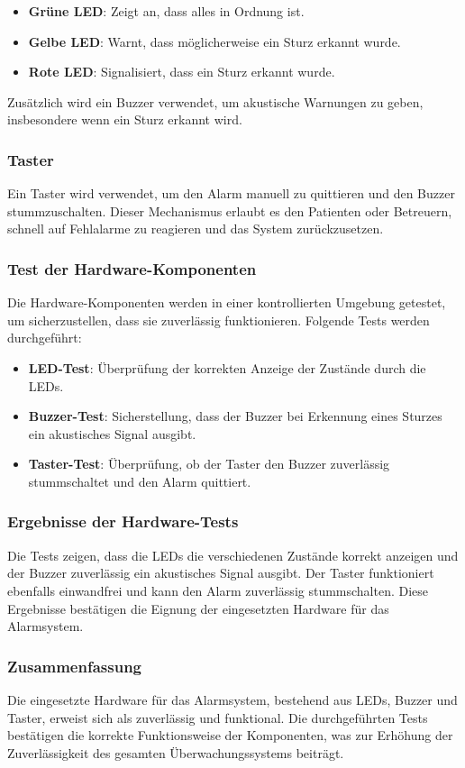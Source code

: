 \begin{itemize}
	\item \textbf{Grüne LED}: Zeigt an, dass alles in Ordnung ist.
	\item \textbf{Gelbe LED}: Warnt, dass möglicherweise ein Sturz erkannt wurde.
	\item \textbf{Rote LED}: Signalisiert, dass ein Sturz erkannt wurde.
\end{itemize}

Zusätzlich wird ein Buzzer verwendet, um akustische Warnungen zu geben, insbesondere wenn ein Sturz erkannt wird. 

\subsubsection{Taster}
Ein Taster wird verwendet, um den Alarm manuell zu quittieren und den Buzzer stummzuschalten. Dieser Mechanismus erlaubt es den Patienten oder Betreuern, schnell auf Fehlalarme zu reagieren und das System zurückzusetzen.

\subsubsection{Test der Hardware-Komponenten}
Die Hardware-Komponenten werden in einer kontrollierten Umgebung getestet, um sicherzustellen, dass sie zuverlässig funktionieren. Folgende Tests werden durchgeführt:

\begin{itemize}
	\item \textbf{LED-Test}: Überprüfung der korrekten Anzeige der Zustände durch die LEDs.
	\item \textbf{Buzzer-Test}: Sicherstellung, dass der Buzzer bei Erkennung eines Sturzes ein akustisches Signal ausgibt.
	\item \textbf{Taster-Test}: Überprüfung, ob der Taster den Buzzer zuverlässig stummschaltet und den Alarm quittiert.
\end{itemize}

\subsubsection{Ergebnisse der Hardware-Tests}
Die Tests zeigen, dass die LEDs die verschiedenen Zustände korrekt anzeigen und der Buzzer zuverlässig ein akustisches Signal ausgibt. Der Taster funktioniert ebenfalls einwandfrei und kann den Alarm zuverlässig stummschalten. Diese Ergebnisse bestätigen die Eignung der eingesetzten Hardware für das Alarmsystem.

\subsubsection{Zusammenfassung}
Die eingesetzte Hardware für das Alarmsystem, bestehend aus LEDs, Buzzer und Taster, erweist sich als zuverlässig und funktional. Die durchgeführten Tests bestätigen die korrekte Funktionsweise der Komponenten, was zur Erhöhung der Zuverlässigkeit des gesamten Überwachungssystems beiträgt.
